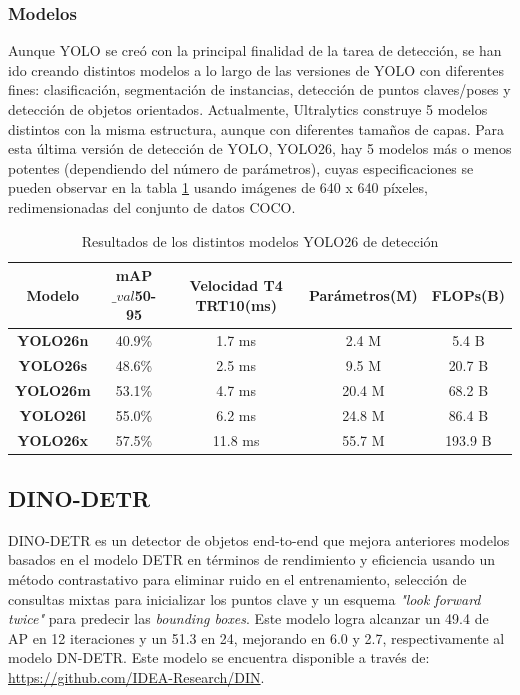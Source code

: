 \documentclass[11pt]{article}
\begin{document}
\subsubsection{Modelos}

Aunque YOLO se creó con la principal finalidad de la tarea de detección, se han ido creando distintos modelos a lo largo de las versiones de YOLO con diferentes fines: clasificación, segmentación de instancias, detección de puntos claves/poses y detección de objetos orientados. Actualmente, Ultralytics construye 5 modelos distintos con la misma estructura, aunque con diferentes tamaños de capas. Para esta última versión de detección de YOLO, YOLO26, hay 5 modelos más o menos potentes (dependiendo del número de parámetros), cuyas especificaciones se pueden observar en la tabla \ref{tab:yolo-models} usando imágenes de 640 x 640 píxeles, redimensionadas del conjunto de datos COCO.

\begin{table}[htb]
    \centering
    \begin{tabular}{c|c|c|c|c}
        \hline
        \textbf{Modelo} & \textbf{mAP}$\_{val}$\textbf{50-95} & \textbf{Velocidad T4 TRT10(ms)} & \textbf{Parámetros(M)} & \textbf{FLOPs(B)}\\
        \hline
        \textbf{YOLO26n} & 40.9\% & 1.7 ms & 2.4 M & 5.4 B\\
        \hline
        \textbf{YOLO26s} & 48.6\% & 2.5 ms & 9.5 M & 20.7 B\\
        \hline
        \textbf{YOLO26m} & 53.1\% & 4.7 ms & 20.4 M & 68.2 B\\
        \hline
        \textbf{YOLO26l} & 55.0\% & 6.2 ms & 24.8 M & 86.4 B\\
        \hline
        \textbf{YOLO26x} & 57.5\% & 11.8 ms & 55.7 M & 193.9 B\\
        \hline
    \end{tabular}
    \caption{Resultados de los distintos modelos YOLO26 de detección}
    \label{tab:yolo-models}
\end{table}


\subsection{DINO-DETR}

DINO-DETR\cite{zhang2022dino} es un detector de objetos end-to-end que mejora anteriores modelos basados en el modelo DETR\cite{DBLP:journals/corr/abs-2005-12872} en términos de rendimiento y eficiencia usando un método contrastativo para eliminar ruido en el entrenamiento, selección de consultas mixtas para inicializar los puntos clave y un esquema \textit{"look forward twice"} para predecir las \textit{bounding boxes}. Este modelo logra alcanzar un 49.4 de AP en 12 iteraciones y un 51.3 en 24, mejorando en 6.0 y 2.7, respectivamente al modelo DN-DETR. Este modelo se encuentra disponible a través de: \url{https://github.com/IDEA-Research/DIN}. 
\end{document}
